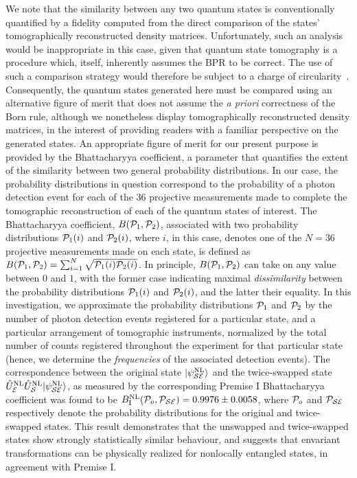 \documentclass[12pt]{iopart}
\begin{document}
We note that the similarity between any two quantum states is conventionally quantified by a fidelity computed from the direct comparison of the states' tomographically reconstructed density matrices. Unfortunately, such an analysis would be inappropriate in this case, given that quantum state tomography is a procedure which, itself, inherently assumes the BPR to be correct. The use of such a comparison strategy would therefore be subject to a charge of circularity~\cite{vermeyden:15}. Consequently, the quantum states generated here must be compared using an alternative figure of merit that does not assume the \textit{a priori} correctness of the Born rule, although we nonetheless display tomographically reconstructed density matrices, in the interest of providing readers with a familiar perspective on the generated states. An appropriate figure of merit for our present purpose is provided by the Bhattacharyya coefficient, a parameter that quantifies the extent of the similarity between two general probability distributions. In our case, the probability distributions in question correspond to the probability of a photon detection event for each of the $36$ projective measurements made to complete the tomographic reconstruction of each of the quantum states of interest. The Bhattacharyya coefficient, $B({\cal P}_1,{\cal P}_2)$, associated with two probability distributions ${\cal P}_1(i)$ and ${\cal P}_2(i)$, where $i$, in this case, denotes one of the $N=36$ projective measurements made on each state, is defined as $B({\cal P}_1,{\cal P}_2)=\sum_{i=1}^{N}\sqrt{{\cal P}_1(i){\cal P}_2(i)}$. In principle, $B({\cal P}_1,{\cal P}_2)$ can take on any value between $0$ and $1$, with the former case indicating maximal \textit{dissimilarity} between the probability distributions ${\cal P}_1(i)$ and ${\cal P}_2(i)$, and the latter their equality. In this investigation, we approximate the probability distributions ${\cal P}_1$ and ${\cal P}_2$ by the number of photon detection events registered for a particular state, and a particular arrangement of tomographic instruments, normalized by the total number of counts registered throughout the experiment for that particular state (hence, we determine the \textit{frequencies} of the associated detection events). The correspondence between the original state $|\psi_{\cal SE}^\mathrm{NL}\rangle$ and the twice-swapped state $\hat{U}_{\cal E}^\mathrm{NL} \hat{U}_{\cal S}^\mathrm{NL} |\psi_{\cal SE}^\mathrm{NL}\rangle$, as measured by the corresponding Premise I Bhattacharyya coefficient was found to be $B^\mathrm{NL}_\mathrm{I}({\cal P}_{o},{\cal P}_{\cal SE})=0.9976\pm0.0058$, where ${\cal P}_{o}$ and ${\cal P}_{\cal SE}$ respectively denote the probability distributions for the original and twice-swapped states. This result demonstrates that the unswapped and twice-swapped states show strongly statistically similar behaviour, and suggests that envariant transformations can be physically realized for nonlocally entangled states, in agreement with Premise I. 
\end{document}
